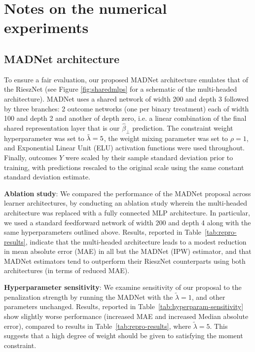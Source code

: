 \section{Notes on the numerical experiments}
\label{supp_numerical}

\subsection{MADNet architecture}

To ensure a fair evaluation, our proposed MADNet architecture emulates that of the RieszNet \citep{Chernozhukov2022} (see Figure \ref{fig:sharedmlps} for a schematic of the multi-headed architecture). MADNet uses a shared network of width 200 and depth 3 followed by three branches: 2 outcome networks (one per binary treatment) each of width 100 and depth 2 and another of depth zero, i.e. a linear combination of the final shared representation layer that is our $\hat{\beta}_\perp$ prediction. The constraint weight hyperparameter was set to $\Tilde{\lambda}=5$, the weight mixing parameter was set to $\rho=1$, and Exponential Linear Unit (ELU) activation functions were used throughout. Finally, outcomes $Y$ were scaled by their sample standard deviation prior to training, with predictions rescaled to the original scale using the same constant standard deviation estimate.

\textbf{Ablation study}: We compared the performance of the MADNet proposal across learner architectures, by conducting an ablation study wherein the multi-headed architecture was replaced with a fully connected MLP architecture. In particular, we used a standard feedforward network of width 200 and depth 4 along with the same hyperparameters outlined above. Results, reported in Table~\ref{tab:repro-results}, indicate that the multi-headed architecture leads to a modest reduction in mean absolute error (MAE) in all but the MADNet (IPW) estimator, and that MADNet estimators tend to outperform their RieszNet counterparts using both architectures (in terms of reduced MAE).

\textbf{Hyperparameter sensitivity}: We examine sensitivity of our proposal to the penalization strength by running the MADNet with the $\tilde{\lambda} = 1$, and other parameters unchanged. Results, reported in Table~\ref{tab:hyperparam-sensitivity} show slightly worse performance (increased MAE and increased Median absolute error), compared to results in Table~\ref{tab:repro-results}, where $\tilde{\lambda} = 5$. This suggests that a high degree of weight should be given to satisfying the moment constraint.

